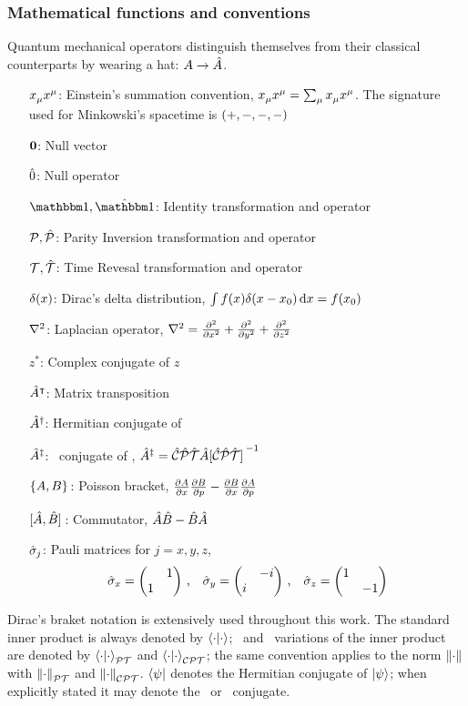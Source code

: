 \subsubsection{Mathematical functions and conventions}
Quantum mechanical operators distinguish themselves from their classical counterparts by wearing a hat: $A \to \hat{A}$.
\begin{enumerate}
    \item[$\tensor{x}{_\mu}\tensor{x}{^\mu}$:] Einstein's summation convention, $\tensor{x}{_\mu}\tensor{x}{^\mu} = \sum\nolimits_\mu \tensor{x}{_\mu}\tensor{x}{^\mu}$. The signature used for Minkowski's spacetime is $\pqty{+,-, -, -}$
    \item[$\vb{0}$:] Null vector
    \item[$\hat{0}$:] Null operator 
    \item[$\idM,\hidM$:] Identity transformation and operator
    \item[$\mathcal{P},\mathcal{\hat{P}}$:] Parity Inversion transformation and operator  
    \item[$\mathcal{T},\mathcal{\hat{T}}$:] Time Revesal transformation and operator
    \item[$\delta\pqty{x}$:] Dirac's delta distribution, $\int{f\pqty{x}\delta\pqty{x-x_0}\dd{x}} = f\pqty{x_0}$
    \item[$\laplacian$:] Laplacian operator, $\laplacian = \pdv[2]{x} + \pdv[2]{y} + \pdv[2]{z}$ 
    \item[$z^*$:] Complex conjugate of $z$
    \item[$\hat{A}^\intercal$:] Matrix transposition
    \item[$\hat{A}^\dag$:] Hermitian conjugate of \hA
    \item[$\hat{A}^\ddag$:] \CPT\ conjugate of \hA, $\hA^\ddag = \CPTtransform{\hA}$
    \item[$\acomm*{A}{B}$:] Poisson bracket, $\pdv{A}{x}\pdv{B}{p} - \pdv{B}{x}\pdv{A}{p}$
    \item[$\comm*{\hA}{\hB}$:] Commutator, $\hat{A}\hat{B} - \hat{B}\hat{A}$  
    \item[$\hat{\sigma}_j$:] Pauli matrices for $j=x,y,z$,
        \begin{equation*}
            \togglehat{\sigma}_x = \pmqty{\admat{1,1}}
            \mycomma \quad
            \togglehat{\sigma}_y = \pmqty{\admat{-i,i}}
            \mycomma \quad
            \togglehat{\sigma}_z = \pmqty{\dmat{1,-1}}
        \end{equation*} 
\end{enumerate}
Dirac's braket notation is extensively used throughout this work. The standard inner product is always denoted by $\bra{\cdot}\ket{\cdot}$; \PT\ and \CPT\ variations of the inner product are denoted by $\braket{\cdot}{\cdot}_{\mathcal{P}\mathcal{T}}$ and $\braket{\cdot}{\cdot}_{\mathcal{C}\mathcal{P}\mathcal{T}}$; the same convention applies to the norm $\norm{\cdot}$ with $\norm{\cdot}_{\mathcal{P}\mathcal{T}}$ and $\norm{\cdot}_{\mathcal{C}\mathcal{P}\mathcal{T}}$. $\bra{\psi}$ denotes the Hermitian conjugate of $\ket{\psi}$; when explicitly stated it may denote the \PT\ or \CPT\ conjugate.